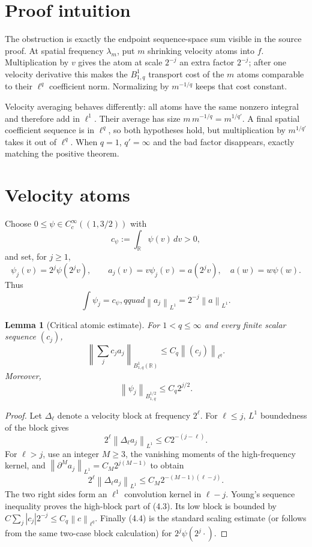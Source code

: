 \documentclass[11pt]{article}
\newtheorem{lemma}[theorem]{Lemma}
\newcommand{\norm}[1]{\left\lVert#1\right\rVert}
\newcommand{\R}{\mathbb R}
\begin{document}
\section{Proof intuition}

The obstruction is exactly the endpoint sequence-space sum visible in the
source proof.  At spatial frequency $\lambda_m$, put $m$ shrinking velocity
atoms into $f$.  Multiplication by $v$ gives the atom at scale $2^{-j}$ an
extra factor $2^{-j}$; after one velocity derivative this makes the
$B^1_{1,q}$ transport cost of the $m$ atoms comparable to their $\ell^q$
coefficient norm.  Normalizing by $m^{-1/q}$ keeps that cost constant.

Velocity averaging behaves differently: all atoms have the same nonzero
integral and therefore add in $\ell^1$.  Their average has size
$m\,m^{-1/q}=m^{1/q'}$.  A final spatial coefficient sequence is in
$\ell^q$, so both hypotheses hold, but multiplication by $m^{1/q'}$ takes it
out of $\ell^q$.  When $q=1$, $q'=\infty$ and the bad factor disappears,
exactly matching the positive theorem.

\section{Velocity atoms}

Choose $0\le\psi\in C_c^\infty((1,3/2))$ with
\[
 c_\psi:=\int_\R\psi(v)\,dv>0,
\]
and set, for $j\ge1$,
\[
 \psi_j(v)=2^j\psi(2^jv),\qquad
 a_j(v)=v\psi_j(v)=a(2^jv),\quad a(w)=w\psi(w).           \tag{4.1}
\]
Thus
\[
 \int\psi_j=c_\psi,qquad \norm{a_j}_{L^1}=2^{-j}\norm a_{L^1}. \tag{4.2}
\]

\begin{lemma}[Critical atomic estimate]\label{lem:atoms}
For $1<q\le\infty$ and every finite scalar sequence $(c_j)$,
\[
 \norm{\sum_jc_ja_j}_{B^1_{1,q}(\R)}
 \le C_q\norm{(c_j)}_{\ell^q}.                            \tag{4.3}
\]
Moreover,
\[
 \norm{\psi_j}_{B^{1/2}_{1,q}}\le C_q2^{j/2}.             \tag{4.4}
\]
\end{lemma}

\begin{proof}
Let $\Delta_\ell$ denote a velocity block at frequency $2^\ell$.
For $\ell\le j$, $L^1$ boundedness of the block gives
\[
 2^\ell\norm{\Delta_\ell a_j}_{L^1}\le C2^{-(j-\ell)}.  \tag{4.5}
\]
For $\ell>j$, use an integer $M\ge3$, the vanishing moments of the
high-frequency kernel, and
$\norm{\partial^Ma_j}_{L^1}=C_M2^{j(M-1)}$ to obtain
\[
 2^\ell\norm{\Delta_\ell a_j}_{L^1}
 \le C_M2^{-(M-1)(\ell-j)}.                               \tag{4.6}
\]
The two right sides form an $\ell^1$ convolution kernel in $\ell-j$.
Young's sequence inequality proves the high-block part of (4.3).  Its low
block is bounded by
$C\sum_j|c_j|2^{-j}\le C_q\norm c_{\ell^q}$.
Finally (4.4) is the standard scaling estimate (or follows from the same
two-case block calculation) for $2^j\psi(2^j\cdot)$.
\end{proof}
\end{document}

